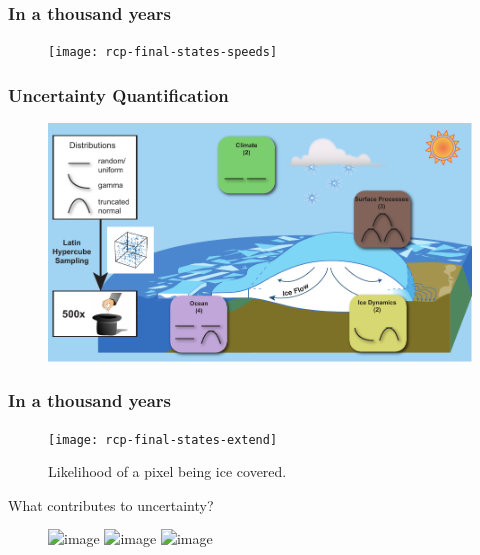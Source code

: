 \documentclass[hide notes,intlimits]{beamer}
\begin{document}
\begin{frame}
  \frametitle{In a thousand years}
  \begin{figure}
    \texttt{[image: rcp-final-states-speeds]}
  \end{figure}
\end{frame}


\begin{frame}
  \frametitle{Uncertainty Quantification}
    \begin{figure}
    \includegraphics[width=\textwidth]{uncertainty-quantification}
    \end{figure}
\end{frame}

\begin{frame}
  \frametitle{In a thousand years}
  \begin{figure}
    \texttt{[image: rcp-final-states-extend]}
  \caption{Likelihood of a pixel being ice covered.}
  \end{figure}
\end{frame}

\begin{frame}{What contributes to uncertainty?}
\begin{figure}
  \includegraphics<1>[width=\textwidth]{sobel_ts_26}
  \includegraphics<2>[width=\textwidth]{sobel_ts_45}
  \includegraphics<3>[width=\textwidth]{sobel_ts_85}
\end{figure}
\end{frame}
\end{document}
